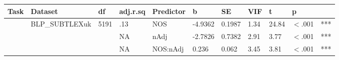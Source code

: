 \begin{table}[ht]
\centering
\begingroup\normalsize
\begin{tabular}{lllllllllll}
  \hline
Task & Dataset & df & adj.r.sq & Predictor & b & SE & VIF & t & p &  \\ 
  \hline
 & BLP\_SUBTLEXuk & 5191 & .13 & NOS & -4.9362 & 0.1987 & 1.34 & 24.84 & $<$.001 & *** \\ 
   &  &  & NA & nAdj & -2.7826 & 0.7382 & 2.91 & 3.77 & $<$.001 & *** \\ 
   &  &  & NA & NOS:nAdj & 0.236 & 0.062 & 3.45 & 3.81 & $<$.001 & *** \\ 
   \hline
\end{tabular}
\endgroup
\end{table}
